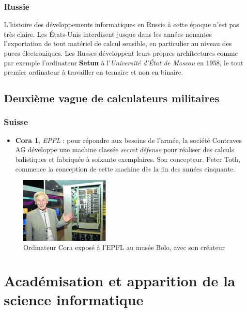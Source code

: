 \documentclass[a4paper,11pt]{book}
\begin{document}
\subsubsection{Russie}
L'histoire des développements informatiques en Russie à cette époque n'est pas très claire. Les États-Unis interdisent jusque dans les années nonantes l'exportation de tout matériel de calcul sensible, en particulier au niveau des puces électroniques. Les Russes développent leurs propres architectures comme par exemple l'ordinateur \textbf{Setun} à l'\textit{Université d'État de Moscou} en 1958, le tout premier ordinateur à travailler en ternaire et non en binaire.
 
 \subsection{Deuxième vague de calculateurs militaires}
 \subsubsection{Suisse}
 \begin{itemize}
     \item \textbf{Cora 1}, \textit{EPFL} : pour répondre aux besoins de l'armée, la société Contraves AG développe une machine classée \textit{secret défense} pour réaliser des calculs balistiques et fabriquée à soixante exemplaires. Son concepteur, Peter Toth, commence la conception de cette machine dès la fin des années cinquante.
 \end{itemize}

\begin{figure}[h]
    \centering
    \includegraphics[width=0.4\textwidth]{media/machines/cora.jpeg}
    \caption{Ordinateur Cora exposé à l'EPFL au musée Bolo, avec son créateur}
\end{figure}

\section{Académisation et apparition de la science informatique}
\end{document}
